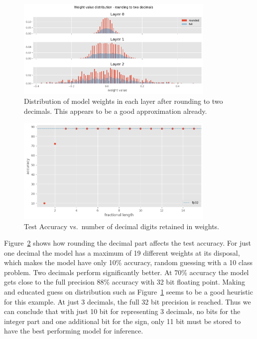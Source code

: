 \documentclass[11pt]{article}
\begin{document}
\begin{figure}[H]
	\centering
	\includegraphics[width=0.85\textwidth]{figures/118_dist2.png}
	\caption{Distribution of model weights in each layer after rounding to two decimals.
	This appears to be a good approximation already.}
	\label{fig:118_2}
\end{figure}

\begin{figure}[H]
	\centering
	\includegraphics[width=0.85\textwidth]{figures/118_accuracy.png}
	\caption{Test Accuracy vs.\ number of decimal digits retained in weights.}
	\label{fig:118_acc}
\end{figure}

Figure~\ref{fig:118_acc} shows how rounding the decimal part affects the test accuracy.
For just one decimal the model has a maximum of 19 different weights at its disposal,
which makes the model have only 10\% accuracy, random guessing with a 10 class problem.
Two decimals perform significantly better. At 70\% accuracy the model gets close to the
full precision 88\% accuracy with 32 bit floating point. Making and educated guess on
distribution such as Figure~\ref{fig:118_2} seems to be a good heuristic for this example.
At just 3 decimals, the full 32 bit precision is reached. Thus we can conclude that with
just 10 bit for representing 3 decimals, no bits for the integer part and one additional
bit for the sign, only 11 bit must be stored to have the best performing model for
inference.
\end{document}
